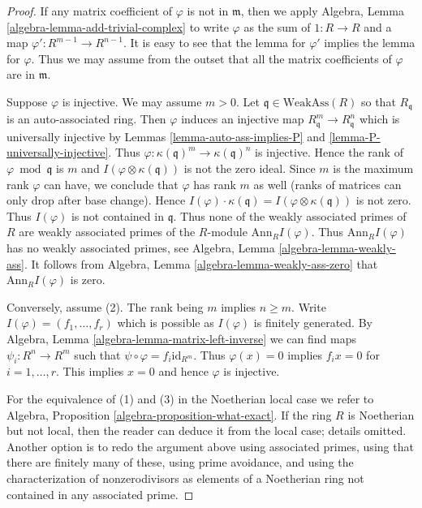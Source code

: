 \begin{proof}
If any matrix coefficient of $\varphi$ is not in $\mathfrak m$, then we apply
Algebra, Lemma \ref{algebra-lemma-add-trivial-complex}
to write $\varphi$ as the sum of $1 : R \to R$ and a map
$\varphi' : R^{m-1} \to R^{n-1}$. It is easy to see that
the lemma for $\varphi'$ implies the lemma for $\varphi$.
Thus we may assume from the outset that all the matrix
coefficients of $\varphi$ are in $\mathfrak m$.

\medskip\noindent
Suppose $\varphi$ is injective. We may assume $m > 0$.
Let $\mathfrak q \in \text{WeakAss}(R)$ so that $R_\mathfrak q$
is an auto-associated ring. Then $\varphi$
induces an injective map $R_\mathfrak q^m \to R_\mathfrak q^n$
which is universally injective by
Lemmas \ref{lemma-auto-ass-implies-P} and \ref{lemma-P-universally-injective}.
Thus $\varphi : \kappa(\mathfrak q)^m \to \kappa(\mathfrak q)^n$
is injective. Hence the rank of $\varphi \bmod \mathfrak q$ is $m$ and
$I(\varphi \otimes \kappa(\mathfrak q))$ is not the zero ideal.
Since $m$ is the maximum rank $\varphi$ can have, we conclude
that $\varphi$ has rank $m$ as well (ranks of matrices
can only drop after base change). Hence
$I(\varphi) \cdot \kappa(\mathfrak q) =
I(\varphi \otimes \kappa(\mathfrak q))$ is not zero.
Thus $I(\varphi)$ is not contained in $\mathfrak q$.
Thus none of the weakly associated primes of $R$
are weakly associated primes of the $R$-module
$\text{Ann}_R I(\varphi)$. Thus $\text{Ann}_R I(\varphi)$
has no weakly associated primes, see
Algebra, Lemma \ref{algebra-lemma-weakly-ass}.
It follows from Algebra, Lemma
\ref{algebra-lemma-weakly-ass-zero}
that $\text{Ann}_R I(\varphi)$ is zero.

\medskip\noindent
Conversely, assume (2). The rank being $m$ implies $n \geq m$.
Write $I(\varphi) = (f_1, \ldots, f_r)$ which is possible as
$I(\varphi)$ is finitely generated. By
Algebra, Lemma \ref{algebra-lemma-matrix-left-inverse}
we can find maps $\psi_i : R^n \to R^m$ such that
$\psi \circ \varphi = f_i \text{id}_{R^m}$. Thus
$\varphi(x) = 0$ implies $f_i x = 0$ for $i = 1, \ldots, r$.
This implies $x = 0$ and hence $\varphi$ is injective.

\medskip\noindent
For the equivalence of (1) and (3) in the Noetherian local case
we refer to Algebra, Proposition \ref{algebra-proposition-what-exact}.
If the ring $R$ is Noetherian but not local, then the reader can
deduce it from the local case; details omitted.
Another option is to redo the argument above using associated
primes, using that there are finitely many of these, using
prime avoidance, and using the characterization of nonzerodivisors
as elements of a Noetherian ring not contained in any associated prime.
\end{proof}

